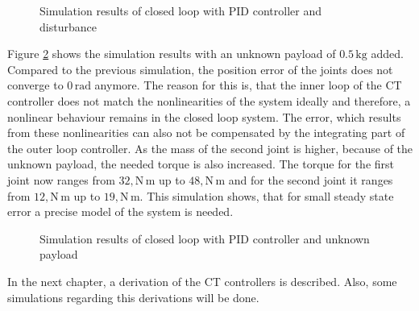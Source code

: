 \begin{figure}[H]
	\centering
	
	\caption{Simulation results of closed loop with PID controller and disturbance}
	\label{fig:ch2_sim12}
\end{figure}
Figure \ref{fig:ch2_sim22} shows the simulation results with an unknown payload of $0.5\,\mathrm{kg}$ added. Compared to the previous simulation, the position error of the joints does not converge to $0\,\mathrm{rad}$ anymore. The reason for this is, that the inner loop of the \ac{CT} controller does not match the nonlinearities of the system ideally and therefore, a nonlinear behaviour remains in the closed loop system. The error, which results from these nonlinearities can also not be compensated by the integrating part of the outer loop controller. As the mass of the second joint is higher, because of the unknown payload, the needed torque is also increased. The torque for the first joint now ranges from $32,\mathrm{N\,m}$ up to $48,\mathrm{N\,m}$ and for the second joint it ranges from $12,\mathrm{N\,m}$ up to $19,\mathrm{N\,m}$. This simulation shows, that for small steady state error a precise model of the system is needed.
\begin{figure}[H]
	\centering
	
	\caption{Simulation results of closed loop with PID controller and unknown payload}
	\label{fig:ch2_sim22}
\end{figure}
In the next chapter, a derivation of the \ac{CT} controllers is described. Also, some simulations regarding this derivations will be done.